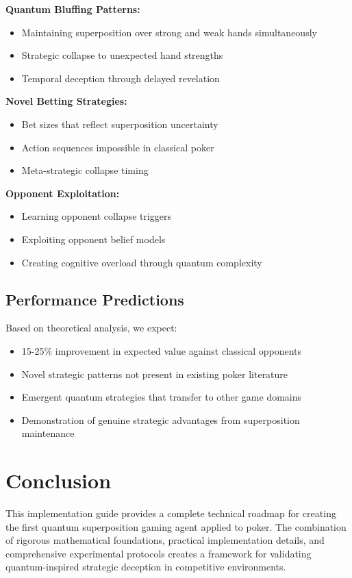 \documentclass[11pt,a4paper]{article}
\begin{document}
\textbf{Quantum Bluffing Patterns:}
\begin{itemize}
\item Maintaining superposition over strong and weak hands simultaneously
\item Strategic collapse to unexpected hand strengths
\item Temporal deception through delayed revelation
\end{itemize}

\textbf{Novel Betting Strategies:}
\begin{itemize}
\item Bet sizes that reflect superposition uncertainty
\item Action sequences impossible in classical poker
\item Meta-strategic collapse timing
\end{itemize}

\textbf{Opponent Exploitation:}
\begin{itemize}
\item Learning opponent collapse triggers
\item Exploiting opponent belief models
\item Creating cognitive overload through quantum complexity
\end{itemize}

\subsection{Performance Predictions}

Based on theoretical analysis, we expect:
\begin{itemize}
\item 15-25\% improvement in expected value against classical opponents
\item Novel strategic patterns not present in existing poker literature
\item Emergent quantum strategies that transfer to other game domains
\item Demonstration of genuine strategic advantages from superposition maintenance
\end{itemize}

\section{Conclusion}

This implementation guide provides a complete technical roadmap for creating the first quantum superposition gaming agent applied to poker. The combination of rigorous mathematical foundations, practical implementation details, and comprehensive experimental protocols creates a framework for validating quantum-inspired strategic deception in competitive environments.
\end{document}
